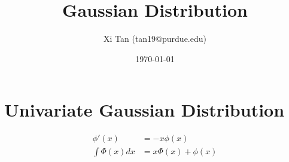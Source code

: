 \documentclass{article}
\title{Gaussian Distribution}
\author{Xi Tan (tan19@purdue.edu)}
\date{\today}
\begin{document}
\maketitle

\section{Univariate Gaussian Distribution}
\begin{align}
	\phi'(x) &= -x\phi(x)\\
	\int \Phi(x) dx &= x\Phi(x)+\phi(x)
\end{align}
\end{document}
